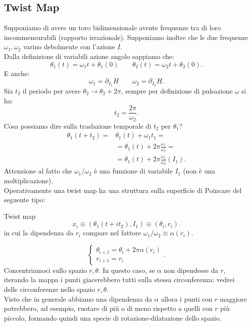 \subsection{Twist Map}%
\label{sub:Twist Map}
Supponiamo di avere un toro bidimensionale avente frequenze tra di loro incommensurabili (rapporto irrazionale). Supponiamo inoltre che le due frequenze $\omega_1, \omega_2$ varino debolmente con l'azione $I$.\\
Dalla definizione di variabili azione angolo sappiamo che:
\[
    \theta_1(t)=\omega_1t+\theta_1(0) \qquad
    \theta_2(t)=\omega_2t+\theta_2(0)
.\] 
E anche:
\[
    \omega_1 = \partial_{I_1}H \qquad \omega_2 = \partial_{I_2}H
.\] 
Sia $t_2$  il periodo per avere $\theta_2\to \theta_2+2\pi$, sempre per definizione di pulsazione $\omega$ si ha:
\[
    t_2 =  \frac{2\pi}{\omega_2}
.\] 
Cosa possiamo dire sulla traslazione temporale di $t_2$  per $\theta_1$?
\[\begin{aligned}
    \theta_1(t+t_2) =& \theta_1(t)+\omega_1t_1 = \\
		     & = \theta_1(t) + 2\pi\frac{\omega_1}{\omega_2} = \\
		     & =\theta_1(t) + 2\pi  \frac{\omega_1}{\omega_2}(I_1)
.\end{aligned}\]
Attenzione al fatto che $\omega_1/\omega_2$ è una funzione di variabile $I_1$ (non è una moltiplicazione).\\
Operativamente una twist map ha una struttura sulla superficie di Poincare del seguente tipo:
\begin{redbox}{Twist map}
    \[
	x_i \equiv \left(\theta_1(t+it_2), I_1\right) \equiv (\theta_i, r_i)
    .\] 
    in cui la dipendenza da $r_i$ compare nel fattore $\omega_1 /\omega_2 \equiv \alpha (r_i)$.
\end{redbox}
\noindent
\begin{exmp}
    \[
        \begin{cases}
	    \theta_{i+1} = \theta_i + 2\pi\alpha (r_i)\\
	    r_{i+1}=r_i
        \end{cases}
    .\] 
    Concentriamoci sullo spazio $r, \theta$. In questo caso, se $\alpha$ non dipendesse da $r$, iterando la mappa i punti giacerebbero tutti sulla stessa circonferenza: vedrei delle circonferenze nello spazio $r,\theta$.\\
    Visto che in generale abbiamo una dipendenza da $\alpha$ allora i punti con $r$ maggiore potrebbero, ad esempio, ruotare di più o di meno rispetto a quelli con $r$ più piccolo, formando quindi una specie di rotazione-dilatazione dello spazio.
\end{exmp}
